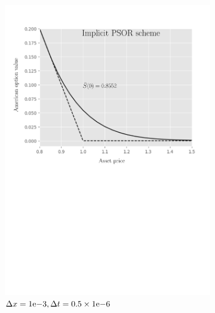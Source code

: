 \begin{figure}[tbp]
\begin{subfigure}{0.4\textwidth}
    \includegraphics[width=\textwidth]{chapters/chapter5/TestCase2ImplicitLCP.pdf}
    \caption{$\Delta{x}={1}\mathrm{e}{-3}, \Delta{t}=0.5\times{1}\mathrm{e}{-6}$}
    \label{fig:lcp:numericaresults:test_case_2_implicit}
  \end{subfigure}
  \hspace{0.5cm}
  \begin{subfigure}{0.4\textwidth}
    \label{fig:lcp:numericaresults:test_case_2_crank_nicholson}
    \centering

\end{subfigure}
\end{figure}
